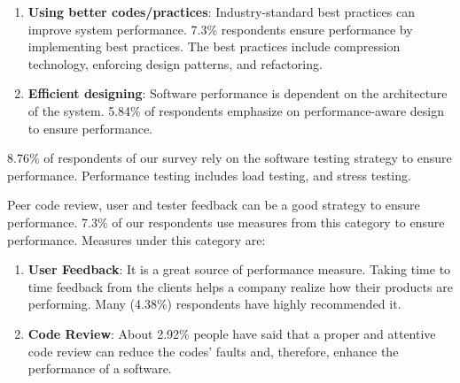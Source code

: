 \begin{enumerate}[label=(\alph*)]

    \item \textbf{Using better codes/practices}: Industry-standard best practices can improve system performance. 7.3\% respondents ensure performance by implementing best practices. The best practices include compression technology, enforcing design patterns, and refactoring.
    
    \item \textbf{Efficient designing}: Software performance is dependent on the architecture of the system. 5.84\% of respondents emphasize on performance-aware design to ensure performance.

\end{enumerate}

 8.76\% of respondents of our survey rely on the software testing strategy to ensure performance. Performance testing includes load testing, and stress testing.
 
 Peer code review, user and tester feedback can be a good strategy to ensure performance. 7.3\% of our respondents use measures from this category to ensure performance. Measures under this category are:
 
 \begin{enumerate}[label=(\alph*)]
 
     \item \textbf{User Feedback}: It is a great source of performance measure. Taking time to time feedback from the clients helps a company realize how their products are performing. Many (4.38\%) respondents have highly recommended it.
    
    \item \textbf{Code Review}: About 2.92\% people have said that a proper and attentive code review can reduce the codes' faults and, therefore, enhance the performance of a software.
 
 \end{enumerate}


